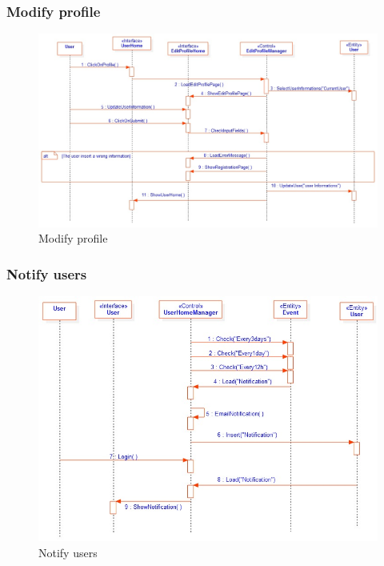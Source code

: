 \subsubsection{Modify profile}
\begin{figure}[tbh]
  \begin{center}
  \includegraphics[width=150mm]{6modify}
    \caption{Modify profile}\label{Fig 1:}
  \end{center}
\end{figure}
\newpage
\subsubsection{Notify users}
\begin{figure}[tbh]
  \begin{center}
  \includegraphics[width=150mm]{7notify}
    \caption{Notify users}\label{Fig 1:}
  \end{center}
\end{figure}
\newpage
